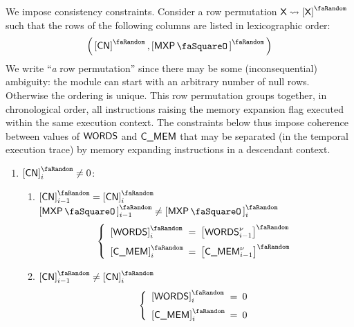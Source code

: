 We impose consistency constraints. Consider a row permutation $\col{X}\rightsquigarrow\order{\col{X}}$ such that the rows of the following columns are listed in lexicographic order:
\[
	\Big(
		\order{\cn},
		\order{\mxpStamp}
	\Big)
\]
We write ``\emph{a} row permutation'' since there may be some (inconsequential) ambiguity: the module can start with an arbitrary number of null rows. Otherwise the ordering is unique. This row permutation groups together, in chronological order, all instructions raising the memory expansion flag executed within the same execution context. The constraints below thus impose coherence between values of $\textsf{WORDS}$ and $\textsf{C\_MEM}$ that may be separated (in the temporal execution trace) by memory expanding instructions in a descendant context.
\begin{enumerate}
	\item \If $\order{\cn}_i\neq 0$:
	\begin{enumerate}
		\item \If $\order{\cn}_{i - 1} = \order{\cn}_{i}$ \et $\order{\mxpStamp}_{i - 1} \neq \order{\mxpStamp}_{i}$\Then
		\[
		\left\{
		\begin{array}{lcl}
			\order{\memSize}_{i} & \!\!\! = \!\!\! & \order{\memSize\new_{i - 1}} \vspace{2mm} \\
			\order{\expCost}_{i} & \!\!\! = \!\!\! & \order{\expCost\new_{i - 1}} \\
		\end{array}
		\right.
		\]
		\item \If $\order{\cn}_{i - 1} \neq \order{\cn}_{i}$ \Then
		\[
		\left\{
		\begin{array}{lcl}
			\order{\memSize}_{i} & \!\!\! = \!\!\! & 0 \vspace{2mm} \\
			\order{\expCost}_{i} & \!\!\! = \!\!\! & 0 \\
		\end{array}
		\right.
		\]
	\end{enumerate}
\end{enumerate}

